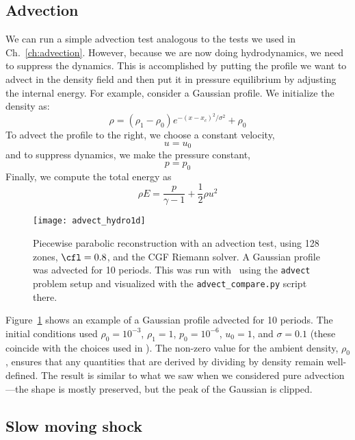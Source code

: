 \subsection{Advection}

We can run a simple advection test analogous to the tests we used in
Ch.~\ref{ch:advection}.  However, because we are now doing hydrodynamics,
we need to suppress the dynamics.  This is accomplished by putting the
profile we want to advect in the density field and then put it in
pressure equilibrium by adjusting the internal energy.  For example, consider
a Gaussian profile.  We initialize the density as:
\begin{equation}
\rho = (\rho_1 - \rho_0) e^{-(x - x_c)^2/\sigma^2} + \rho_0
\end{equation}
To advect the profile to the right, we choose a constant velocity,
\begin{equation}
u = u_0
\end{equation}
and to suppress dynamics, we make the pressure constant,
\begin{equation}
p = p_0
\end{equation}
Finally, we compute the total energy as
\begin{equation}
\rho E = \frac{p}{\gamma - 1} + \frac{1}{2}\rho u^2
\end{equation}

\begin{figure}[t]
\centering
\texttt{[image: advect\_hydro1d]}
\caption[Simple advection test]{\label{fig:Euler:advect:1d} Piecewise
  parabolic reconstruction with an advection test, using 128 zones,
  $\cfl = 0.8$, and the CGF Riemann solver.  A Gaussian profile was
  advected for 10 periods.  This was run with \hydrooned\ using the
  {\tt advect} problem setup and
  visualized with the {\tt advect\_compare.py} script there.}
\end{figure}

Figure~\ref{fig:Euler:advect:1d} shows an example of a Gaussian
profile advected for 10 periods.  The initial conditions used $\rho_0
= 10^{-3}$, $\rho_1 = 1$, $p_0 = 10^{-6}$, $u_0 = 1$, and $\sigma =
0.1$ (these coincide with the choices used in \cite{flash}).  The
non-zero value for the ambient density, $\rho_0$, ensures that any
quantities that are derived by dividing by density remain
well-defined.  The result is similar to what we saw when we considered
pure advection---the shape is mostly preserved, but the peak of the
Gaussian is clipped.

\subsection{Slow moving shock}

